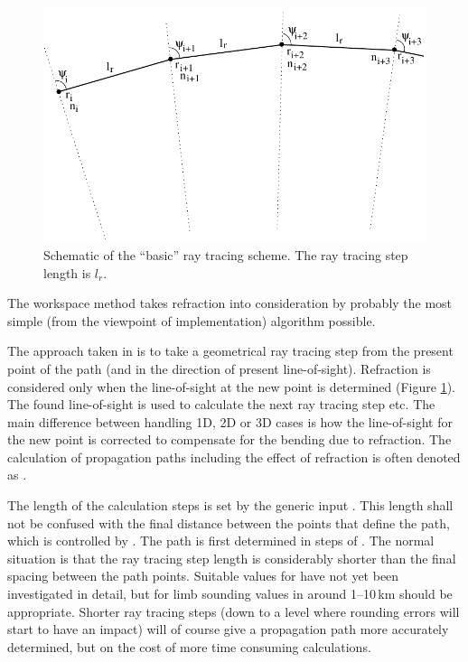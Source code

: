 \begin{figure}[!p]
 \begin{center}
  \includegraphics*{euler}
  \caption{Schematic of the ``basic'' ray tracing scheme. The ray tracing step 
    length is $l_r$. }
  \label{fig:ppath:euler}  
 \end{center}
\end{figure}

The workspace method  takes
refraction into consideration by probably the most simple (from the
viewpoint of implementation) algorithm possible. 

The approach taken in  is to take a
geometrical ray tracing step from the present point of the path (and in the
direction of present line-of-sight). Refraction is considered only when the
line-of-sight at the new point is determined (Figure \ref{fig:ppath:euler}).
The found line-of-sight is used to calculate the next ray tracing step etc. The
main difference between handling 1D, 2D or 3D cases is how the line-of-sight
for the new point is corrected to compensate for the bending due to refraction.
The calculation of propagation paths including the effect of refraction is
often denoted as .

The length of the calculation steps is set by the generic input
. This length shall not be confused with the
final distance between the points that define the path, which is
controlled by . The path is first
determined in steps of . The normal situation
is that the ray tracing step length is considerably shorter than the
final spacing between the path points. Suitable values for
 have not yet been investigated in detail, but
for limb sounding values in around 1--10\,km should be appropriate.
Shorter ray tracing steps (down to a level where rounding errors will
start to have an impact) will of course give a propagation path more
accurately determined, but on the cost of more time consuming
calculations.


